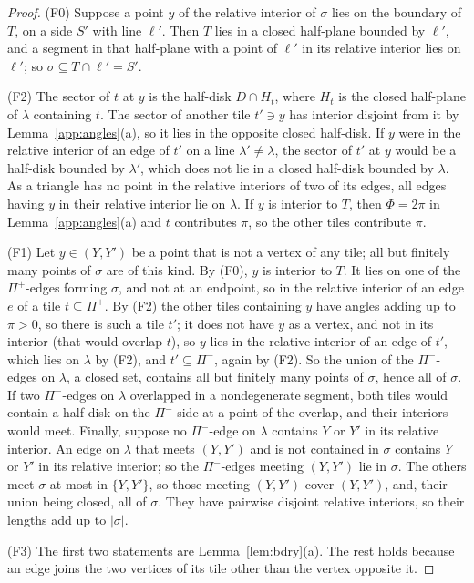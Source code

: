 \documentclass[11pt]{amsart}
\theoremstyle{remark}
\begin{document}
\begin{proof}
(F0) Suppose a point $y$ of the relative interior of $\sigma$ lies on the boundary of $T$, on a side $S'$ with line $\ell'$. Then $T$ lies in a closed half-plane bounded by $\ell'$, and a segment in that half-plane with a point of $\ell'$ in its relative interior lies on $\ell'$; so $\sigma\subseteq T\cap\ell'=S'$.

(F2) The sector of $t$ at $y$ is the half-disk $D\cap H_t$, where $H_t$ is the closed half-plane of $\lambda$ containing $t$. The sector of another tile $t'\ni y$ has interior disjoint from it by Lemma~\ref{app:angles}(a), so it lies in the opposite closed half-disk. If $y$ were in the relative interior of an edge of $t'$ on a line $\lambda'\neq\lambda$, the sector of $t'$ at $y$ would be a half-disk bounded by $\lambda'$, which does not lie in a closed half-disk bounded by $\lambda$. As a triangle has no point in the relative interiors of two of its edges, all edges having $y$ in their relative interior lie on $\lambda$. If $y$ is interior to $T$, then $\Phi=2\pi$ in Lemma~\ref{app:angles}(a) and $t$ contributes $\pi$, so the other tiles contribute $\pi$.

(F1) Let $y\in(Y,Y')$ be a point that is not a vertex of any tile; all but finitely many points of $\sigma$ are of this kind. By (F0), $y$ is interior to $T$. It lies on one of the $\Pi^+$-edges forming $\sigma$, and not at an endpoint, so in the relative interior of an edge $e$ of a tile $t\subseteq\Pi^+$. By (F2) the other tiles containing $y$ have angles adding up to $\pi>0$, so there is such a tile $t'$; it does not have $y$ as a vertex, and not in its interior (that would overlap $t$), so $y$ lies in the relative interior of an edge of $t'$, which lies on $\lambda$ by (F2), and $t'\subseteq\Pi^-$, again by (F2). So the union of the $\Pi^-$-edges on $\lambda$, a closed set, contains all but finitely many points of $\sigma$, hence all of $\sigma$. If two $\Pi^-$-edges on $\lambda$ overlapped in a nondegenerate segment, both tiles would contain a half-disk on the $\Pi^-$ side at a point of the overlap, and their interiors would meet. Finally, suppose no $\Pi^-$-edge on $\lambda$ contains $Y$ or $Y'$ in its relative interior. An edge on $\lambda$ that meets $(Y,Y')$ and is not contained in $\sigma$ contains $Y$ or $Y'$ in its relative interior; so the $\Pi^-$-edges meeting $(Y,Y')$ lie in $\sigma$. The others meet $\sigma$ at most in $\{Y,Y'\}$, so those meeting $(Y,Y')$ cover $(Y,Y')$, and, their union being closed, all of $\sigma$. They have pairwise disjoint relative interiors, so their lengths add up to $|\sigma|$.

(F3) The first two statements are Lemma~\ref{lem:bdry}(a). The rest holds because an edge joins the two vertices of its tile other than the vertex opposite it.
\end{proof}
\end{document}

